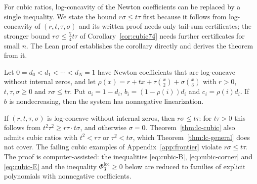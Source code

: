 For cubic ratios, log-concavity of the Newton coefficients can be replaced by a single inequality. We state the bound $r\sigma\leq t\tau$ first because it follows from log-concavity of $(r,t,\tau,\sigma)$ and its written proof needs only tail-sum certificates; the stronger bound $r\sigma\leq\frac74t\tau$ of Corollary~\ref{cor:cubic74} needs further certificates for small $n$. The Lean proof establishes the corollary directly and derives the theorem from it.

\begin{theorem}\label{thm:lc-cubic}
Let $0=d_0<d_1<\cdots<d_N=1$ have Newton coefficients that are log-concave without internal zeros, and let $\rho(x)=r+tx+\tau\binom x2+\sigma\binom x3$ with $r>0$, $t,\tau,\sigma\geq0$ and $r\sigma\leq t\tau$. Put $a_i=1-d_i$, $b_i=(1-\rho(i))d_i$ and $c_i=\rho(i)d_i$. If $b$ is nondecreasing, then the system has nonnegative linearization.
\end{theorem}

If $(r,t,\tau,\sigma)$ is log-concave without internal zeros, then $r\sigma\leq t\tau$: for $t\tau>0$ this follows from $t^2\tau^2\geq r\tau\cdot t\sigma$, and otherwise $\sigma=0$. Theorem~\ref{thm:lc-cubic} also admits cubic ratios with $t^2<r\tau$ or $\tau^2<t\sigma$, which Theorem~\ref{thm:lc-general} does not cover. The failing cubic examples of Appendix~\ref{app:frontier} violate $r\sigma\leq t\tau$. The proof is computer-assisted: the inequalities \eqref{eq:cubic-B}, \eqref{eq:cubic-corner} and \eqref{eq:cubic-E} and the inequality $\Phi^{\mathrm{loc}}_3\geq0$ below are reduced to families of explicit polynomials with nonnegative coefficients.

